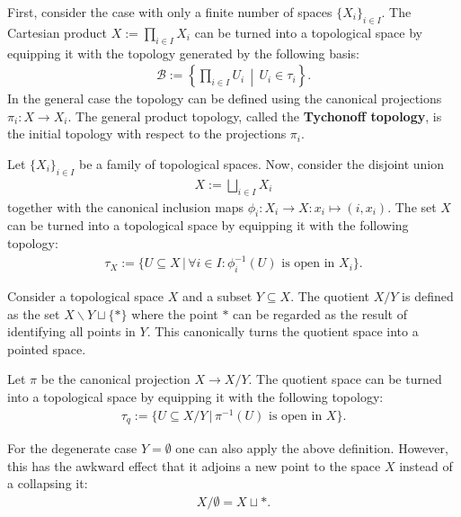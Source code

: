     \begin{construct}\label{topology:tychonoff_topology}
        First, consider the case with only a finite number of spaces $\{X_i\}_{i\in I}$. The Cartesian product $X:=\prod_{i\in I}X_i$ can be turned into a topological space by equipping it with the topology generated by the following basis:
        \begin{gather}
            \mathcal{B} := \left\{\prod_{i\in I}U_i\,\middle\vert\,U_i\in\tau_i\right\}.
        \end{gather}
        In the general case the topology can be defined using the canonical projections $\pi_i:X\rightarrow X_i$. The general product topology, called the \textbf{Tychonoff topology}, is the initial topology with respect to the projections $\pi_i$.
    \end{construct}

    \begin{construct}\label{topology:disjoint_union}
        Let $\{X_i\}_{i\in I}$ be a family of topological spaces. Now, consider the disjoint union
        \begin{gather}
            X := \bigsqcup_{i\in I}X_i
        \end{gather}
        together with the canonical inclusion maps $\phi_i:X_i\rightarrow X:x_i\mapsto(i,x_i)$. The set $X$ can be turned into a topological space by equipping it with the following topology:
        \begin{gather}
            \tau_X := \big\{U\subseteq X\,\big\vert\,\forall i\in I:\phi_i^{-1}(U)\text{ is open in }X_i\big\}.
        \end{gather}
    \end{construct}

    \begin{construct}
        Consider a topological space $X$ and a subset $Y\subseteq X$. The quotient $X/Y$ is defined as the set $X\backslash Y\sqcup\{\ast\}$ where the point $\ast$ can be regarded as the result of identifying all points in $Y$. This canonically turns the quotient space into a pointed space.

        Let $\pi$ be the canonical projection $X\rightarrow X/Y$. The quotient space can be turned into a topological space by equipping it with the following topology:
        \begin{gather}
            \label{topology:quotient_space}
            \tau_q := \big\{U\subseteq X/Y\,\big\vert\,\pi^{-1}(U)\text{ is open in }X\big\}.
        \end{gather}
    \end{construct}
    \begin{remark}
        For the degenerate case $Y=\emptyset$ one can also apply the above definition. However, this has the awkward effect that it adjoins a new point to the space $X$ instead of a collapsing it:
        \begin{gather}
            \label{topology:empty_quotient}
            X/\emptyset = X\sqcup\ast.
        \end{gather}
    \end{remark}


